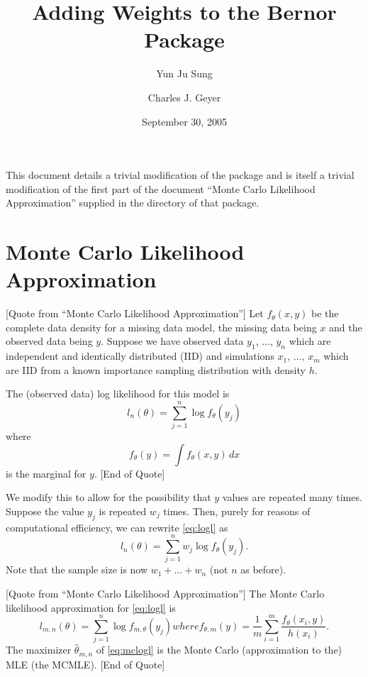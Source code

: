 \documentclass{article}
\begin{document}
\title{Adding Weights to the Bernor Package}

\author{Yun Ju Sung \and Charles J. Geyer}

\date{September 30, 2005}

\maketitle

This document details a trivial modification of the \verb@bernor@ package
and is itself a trivial modification of the first part of the
document ``Monte Carlo Likelihood Approximation'' supplied in the \verb@doc@
directory of that package.

\section{Monte Carlo Likelihood Approximation}

[Quote from ``Monte Carlo Likelihood Approximation'']
Let $f_\theta(x, y)$ be the complete data density for a missing data model,
the missing data being $x$ and the observed data being $y$.
Suppose we have observed data $y_1$, $\ldots$, $y_n$ which are
independent and identically distributed (IID) and
simulations $x_1$, $\ldots$, $x_m$ which are IID from a known importance
sampling distribution with density $h$.

The (observed data) log likelihood for this model is
\begin{equation} \label{eq:logl}
   l_n(\theta) = \sum_{j = 1}^n \log f_\theta(y_j)
\end{equation}
where
$$
   f_\theta(y) = \int f_\theta(x, y) \, d x
$$
is the marginal for $y$.
[End of Quote]

We modify this to allow for the possibility that $y$ values are repeated
many times.  Suppose the value $y_j$ is repeated $w_j$ times.  Then, purely
for reasons of computational efficiency, we can rewrite \eqref{eq:logl}
as
\begin{equation} \label{eq:logl-weigh}
   l_n(\theta) = \sum_{j = 1}^n w_j \log f_\theta(y_j).
\end{equation}
Note that the sample size is now $w_1 + \ldots + w_n$ (not $n$ as before).

[Quote from ``Monte Carlo Likelihood Approximation'']
The Monte Carlo likelihood approximation for \eqref{eq:logl} is
\begin{subequations}
\begin{equation} \label{eq:mclogl}
   l_{m, n}(\theta)
   =
   \sum_{j = 1}^n \log f_{m, \theta}(y_j)
\end{equation}
where
\begin{equation} \label{eq:mcmarg}
   f_{\theta, m}(y)
   =
   \frac{1}{m} \sum_{i = 1}^m \frac{f_\theta(x_i, y)}{h(x_i)}.
\end{equation}
\end{subequations}
The maximizer $\hat{\theta}_{m, n}$ of \eqref{eq:mclogl} is the Monte Carlo
(approximation to the) MLE (the MCMLE).
[End of Quote]
\end{document}
